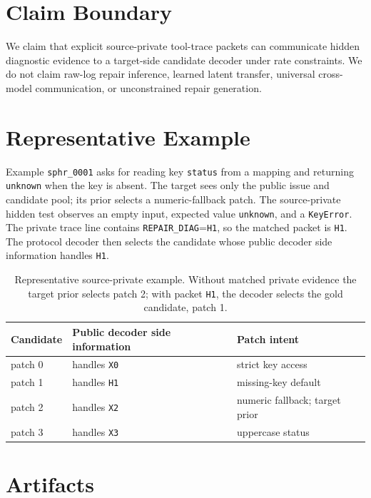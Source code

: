 \documentclass{article}
\newcommand{\diag}{\texttt{REPAIR\_DIAG}}
\begin{document}



\appendix

\section{Claim Boundary}

We claim that explicit source-private tool-trace packets can communicate hidden
diagnostic evidence to a target-side candidate decoder under rate constraints.
We do not claim raw-log repair inference, learned latent transfer, universal
cross-model communication, or unconstrained repair generation.

\section{Representative Example}

Example \texttt{sphr\_0001} asks for reading key \texttt{status} from a mapping
and returning \texttt{unknown} when the key is absent. The target sees only the
public issue and candidate pool; its prior selects a numeric-fallback patch. The
source-private hidden test observes an empty input, expected value
\texttt{unknown}, and a \texttt{KeyError}. The private trace line contains
\diag{}=\texttt{H1}, so the matched packet is \texttt{H1}. The protocol decoder
then selects the candidate whose public decoder side information handles
\texttt{H1}.

\begin{table}[t]
\centering
\small
\begin{tabular}{lll}
\toprule
Candidate & Public decoder side information & Patch intent \\
\midrule
patch 0 & handles \texttt{X0} & strict key access \\
patch 1 & handles \texttt{H1} & missing-key default \\
patch 2 & handles \texttt{X2} & numeric fallback; target prior \\
patch 3 & handles \texttt{X3} & uppercase status \\
\bottomrule
\end{tabular}
\caption{Representative source-private example. Without matched private
evidence the target prior selects patch 2; with packet \texttt{H1}, the decoder
selects the gold candidate, patch 1.}
\label{tab:example}
\end{table}

\section{Artifacts}
\end{document}
